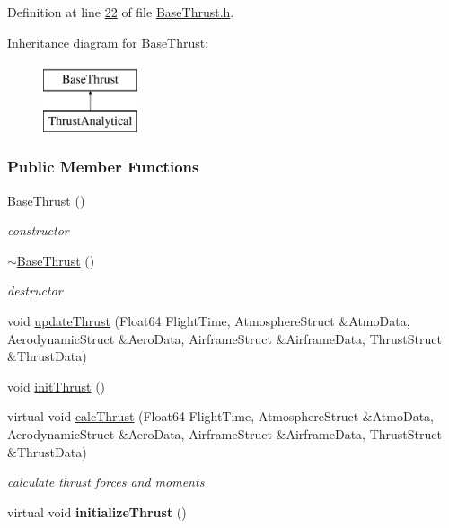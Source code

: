Definition at line \hyperlink{_base_thrust_8h_source_l00022}{22} of file \hyperlink{_base_thrust_8h_source}{Base\+Thrust.\+h}.

Inheritance diagram for Base\+Thrust\+:\begin{figure}[H]
\begin{center}
\leavevmode
\includegraphics[height=2.000000cm]{group___engine}
\end{center}
\end{figure}
\subsubsection*{Public Member Functions}
\begin{DoxyCompactItemize}
\item 
\mbox{\label{group___engine_a19885a6a70bfc4c02e2d8f310af9f22e}} 
\hyperlink{group___engine_a19885a6a70bfc4c02e2d8f310af9f22e}{Base\+Thrust} ()
\begin{DoxyCompactList}\small\item\em constructor \end{DoxyCompactList}\item 
\mbox{\label{group___engine_a554955351c2acfe7a46c00fe056c5c6c}} 
\hyperlink{group___engine_a554955351c2acfe7a46c00fe056c5c6c}{$\sim$\+Base\+Thrust} ()
\begin{DoxyCompactList}\small\item\em destructor \end{DoxyCompactList}\item 
void \hyperlink{group___engine_a869359a1b2b7cddcbe5979d6a1cf5eac}{update\+Thrust} (Float64 Flight\+Time, Atmosphere\+Struct \&Atmo\+Data, Aerodynamic\+Struct \&Aero\+Data, Airframe\+Struct \&Airframe\+Data, Thrust\+Struct \&Thrust\+Data)
\item 
void \hyperlink{group___engine_a1a9a88e6c05cc0b2564522347365900c}{init\+Thrust} ()
\item 
virtual void \hyperlink{group___engine_ac578e683598739655ce52ea85d97362b}{calc\+Thrust} (Float64 Flight\+Time, Atmosphere\+Struct \&Atmo\+Data, Aerodynamic\+Struct \&Aero\+Data, Airframe\+Struct \&Airframe\+Data, Thrust\+Struct \&Thrust\+Data)
\begin{DoxyCompactList}\small\item\em calculate thrust forces and moments \end{DoxyCompactList}\item 
\mbox{\label{group___engine_a373a66f6415f783f0e70782763ae45c7}} 
virtual void {\bfseries initialize\+Thrust} ()
\end{DoxyCompactItemize}


